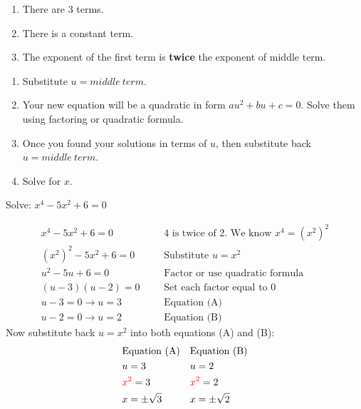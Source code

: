 \begin{tcolorbox}[title=How to find out an equation is in the quadratic form?, 
colback=blue!5!white,
colframe=blue!75!black,
fonttitle=\bfseries]
    \begin{enumerate}[1.]
        \item There are 3 terms.
        \item There is a constant term.
        \item The exponent of the first term is \textbf{twice} the exponent of middle term.
    \end{enumerate}
        \begin{enumerate}[1.]
        \item Substitute $u=middle\ term$.
        \item Your new equation will be a quadratic in form $au^2+bu+c=0$. Solve them using factoring or quadratic formula.
        \item Once you found your solutions in terms of $u$, then substitute back $u=middle\ term$.
        \item Solve for $x$.
    \end{enumerate}
\end{tcolorbox}
\begin{exa}
        Solve: $x^4-5x^2+6=0$
\end{exa}
\begin{align*}
    x^4-5x^2+6=0&   &   &\text{4 is twice of 2. We know $x^4=\left(x^2\right)^2$}\\
    \left(x^2\right)^2-5x^2+6=0&&  &\text{Substitute $u=x^2$}\\
    u^2-5u+6=0&        &   &\text{Factor or use quadratic formula}\\
    (u-3)(u-2)=0&       &   &\text{Set each factor equal to 0}\\
    u-3=0 \rightarrow \boxed{u=3}&      &   &\text{Equation (A)}\\
    u-2=0 \rightarrow \boxed{u=2}&      &   &\text{Equation (B)}
\end{align*}
Now substitute back $u=x^2$ into both equations (A) and (B):
\begin{align*}
    &\text{Equation (A)}    &   &\text{Equation (B)}\\
    &u=3                    &   &u=2\\
    &\textcolor{red}{x^2}=3   &   &\textcolor{red}{x^2}=2\\
    &x=\pm\sqrt{3}            &   &x=\pm\sqrt{2}
\end{align*}

